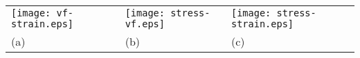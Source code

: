 \documentclass[10pt,a4paper]{article}
\begin{document}
\begin{tabular}{l@{}l@{}l}
  \texttt{[image: vf-strain.eps]}
  &
  \texttt{[image: stress-vf.eps]}
  &
    \texttt{[image: stress-strain.eps]}\\
    (a)&(b)&(c)
\end{tabular}
\end{document}

